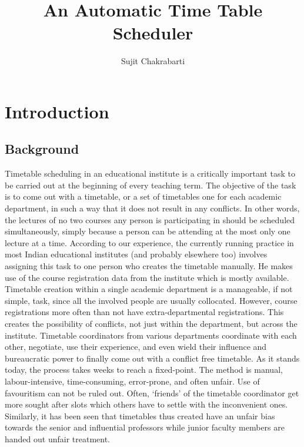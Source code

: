 \documentclass[11pt,a4paper]{article}
\author{Sujit Chakrabarti}
\title{An Automatic Time Table Scheduler}
\begin{document}
\maketitle
{} %

\newcommand{\highlight}[1]{{\color{Red}(#1)}}
\newcommand{\comment}[1]{{\color{Blue}#1}}

\newtheorem{mydef}{Definition}
\newtheorem{myex}{Example}
\section{Introduction}
\subsection{Background}
Timetable scheduling in an educational institute is a critically important task to be carried out at the beginning of every teaching term. The objective of the task is to come out with a timetable, or a set of timetables one for each academic department, in such a way that it does not result in any conflicts. In other words, the lectures of no two courses any person is participating in should be scheduled simultaneously, simply because a person can be attending at the most only one lecture at a time.
According to our experience, the currently running practice in most Indian educational institutes (and probably elsewhere too) involves assigning this task to one person who creates the timetable manually. He makes use of the course registration data from the institute which is mostly available. Timetable creation within a single academic department is a manageable, if not simple, task, since all the involved people are usually collocated. However, course registrations more often than not have extra-departmental registrations. This creates the possibility of conflicts, not just within the department, but across the institute. Timetable coordinators from various departments coordinate with each other, negotiate, use their experience, and even wield their influence and bureaucratic power to finally come out with a conflict free timetable. As it stands today, the process takes weeks to reach a fixed-point. The method is manual, labour-intensive, time-consuming, error-prone, and often unfair. Use of favouritism can not be ruled out. Often, ‘friends’ of the timetable coordinator get more sought after slots which others have to settle with the inconvenient ones. Similarly, it has been seen that timetables thus created have an unfair bias towards the senior and influential professors while junior faculty members are handed out unfair treatment.
\end{document}
